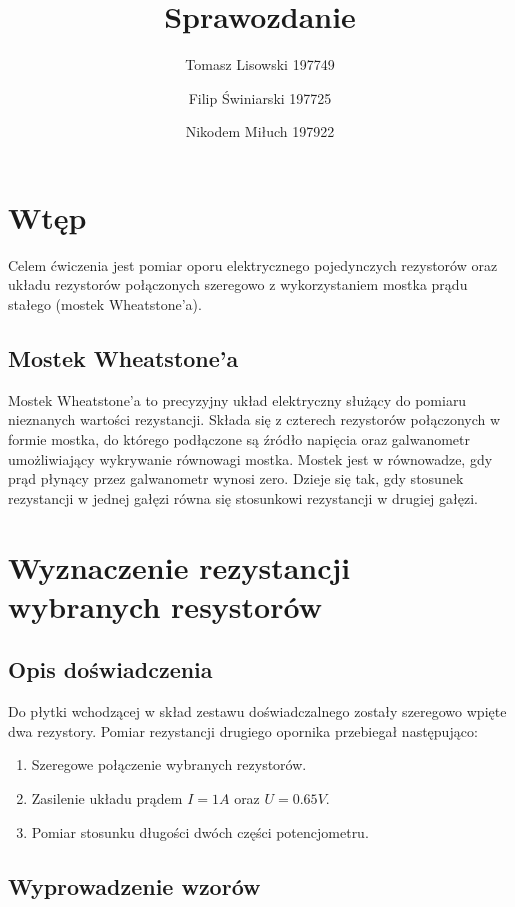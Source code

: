 \documentclass{article} %
\title{Sprawozdanie}
\author{Tomasz Lisowski 197749\and Filip Świniarski 197725\and Nikodem Miłuch 197922}
\begin{document}
\maketitle

\section{Wtęp}

Celem ćwiczenia jest pomiar oporu elektrycznego pojedynczych rezystorów
oraz układu rezystorów połączonych szeregowo z wykorzystaniem mostka prądu stałego (mostek Wheatstone’a).

\subsection{Mostek Wheatstone'a}

Mostek Wheatstone’a to precyzyjny układ elektryczny służący do pomiaru nieznanych wartości rezystancji. Składa się z czterech rezystorów połączonych w formie mostka, do którego podłączone są źródło napięcia oraz galwanometr umożliwiający wykrywanie równowagi mostka. Mostek jest w równowadze, gdy prąd płynący przez galwanometr wynosi zero. Dzieje się tak, gdy stosunek rezystancji w jednej gałęzi równa się stosunkowi rezystancji w drugiej gałęzi.

\section{Wyznaczenie rezystancji wybranych resystorów}

\subsection{Opis doświadczenia}

Do płytki wchodzącej w skład zestawu doświadczalnego zostały szeregowo wpięte dwa rezystory. Pomiar rezystancji drugiego opornika przebiegał następująco:
{\begin{enumerate}
    \item Szeregowe połączenie wybranych rezystorów.
    \item Zasilenie układu prądem $I = 1A$ oraz $U = 0.65V$.
    \item Pomiar stosunku długości dwóch części potencjometru.
\end{enumerate}
}

\subsection{Wyprowadzenie wzorów}
\end{document}
